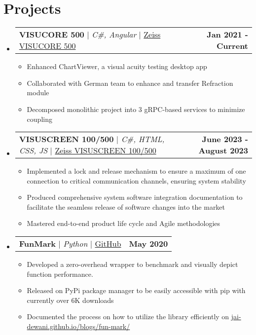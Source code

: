 \documentclass[letterpaper,11pt]{article}
\makeatletter
\newcommand{\resumeItem}[1]{
  \item\small{
    {#1 \vspace{-2pt}}
  }
}
\newcommand{\resumeProjectHeading}[2]{
    \item
    \begin{tabular*}{1.001\textwidth}{l@{\extracolsep{\fill}}r}
      \small#1 & \textbf{\small #2} \\
    \end{tabular*}\vspace{-7pt}
}
\newcommand{\resumeSubHeadingListStart}{\begin{itemize}[leftmargin=0.0in, label={}]}
\newcommand{\resumeSubHeadingListEnd}{\end{itemize}}
\newcommand{\resumeItemListStart}{\justify \begin{itemize} \vspace{-4pt}}
\newcommand{\resumeItemListEnd}{\end{itemize}\vspace{-1pt}}
\makeatother
\begin{document}
\section{Projects}
    \vspace{-2pt}
    \resumeSubHeadingListStart
        \resumeProjectHeading
            {\textbf{VISUCORE 500} $|$ \emph{C\#, Angular}  $|$ \href{https://www.zeiss.com/vision-care/int/eye-care-professionals/equipment/refraction/combined-refraction-unit.html}{Zeiss VISUCORE 500}}{Jan 2021 - Current}
            \resumeItemListStart
                \resumeItem{Enhanced ChartViewer, a visual acuity testing desktop app}
                \resumeItem{Collaborated with German team to enhance and transfer Refraction module}
                \resumeItem{Decomposed monolithic project into 3 gRPC-based services to minimize coupling}
            \resumeItemListEnd
        \resumeProjectHeading
            {\textbf{VISUSCREEN 100/500} $|$ \emph{C\#, HTML, CSS, JS}  $|$ \href{https://www.zeiss.com/vision-care/int/eye-care-professionals/equipment/refraction/subjective-refraction-unit.html}{Zeiss VISUSCREEN 100/500}}{June 2023 - August 2023}
            \resumeItemListStart
                \resumeItem{Implemented a lock and release mechanism to ensure a maximum of one connection to critical communication channels, ensuring system stability}
                \resumeItem{Produced comprehensive system software integration documentation to facilitate the seamless release of software changes into the market}
                \resumeItem{Mastered end-to-end product life cycle and Agile methodologies}
            \resumeItemListEnd
        \resumeProjectHeading
            {\textbf{FunMark} $|$ \emph{Python} $|$ \href{https://github.com/jai-dewani/fun-mark}{GitHub}}{May 2020} 
            \resumeItemListStart
                \resumeItem{Developed a zero-overhead wrapper to benchmark and visually depict function performance.}
                \resumeItem{Released on PyPi package manager to be easily accessible with pip with currently over 6K downloads}
                \resumeItem{Documented the process on how to utilize the library efficiently on \href{https://jai-dewani.github.io/blogs/fun-mark/}{jai-dewani.github.io/blogs/fun-mark/}}
            \resumeItemListEnd 
    \resumeSubHeadingListEnd

%
\end{document}
